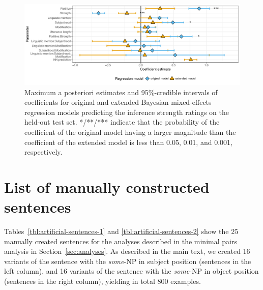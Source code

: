 \documentclass[11pt,a4paper]{article}
\newcommand{\sectionref}[1]{Section~\ref{#1}}
\begin{document}
\begin{figure}[h]
\center
\includegraphics[width=\textwidth]{./images/eval-coefficient-estimates.pdf}
\caption{Maximum a posteriori estimates and 95\%-credible intervals of coefficients for original and extended Bayesian mixed-effects regression models predicting the inference strength ratings on the held-out test set. */**/*** indicate that the probability of the coefficient of the original model having a larger magnitude than the coefficient of the extended model is less than 0.05, 0.01, and 0.001, respectively.}
	\label{fig:eval-coefficients}
\end{figure}


\clearpage

\section{List of manually constructed sentences}
\label{app:sentences}
Tables~\ref{tbl:artificial-sentences-1} and \ref{tbl:artificial-sentences-2} show the 25 manually created sentences for the analyses described in the minimal pairs analysis in \sectionref{sec:analyses}. As described in the main text, we created 16 variants of the sentence with the \emph{some}-NP in subject position (sentences in the left column), and 16 variants of the sentence with the \emph{some}-NP in object position (sentences in the right column), yielding in total 800 examples.
\end{document}
